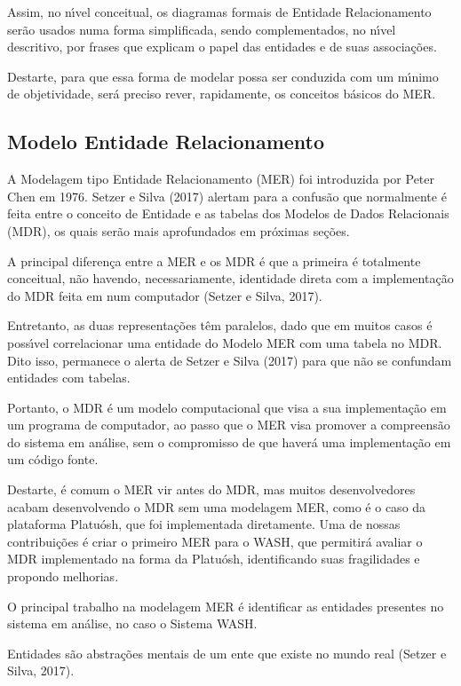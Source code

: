\documentclass[
12pt,		%
openright,	%
twoside,  %
a4paper,			%
chapter=TITLE,		%
english,			%
french,				%
spanish,			%
brazil				%
]{USPSC-classe/USPSC}
\begin{document}
Assim, no n\'{\i}vel conceitual, os diagramas formais de Entidade Relacionamento ser\~ao usados numa forma simplificada, sendo complementados, no n\'{\i}vel descritivo, por frases que explicam o papel das entidades e de suas associa\c{c}\~oes.


Destarte, para que essa forma de modelar possa ser conduzida com um m\'{\i}nimo de objetividade, ser\'a preciso rever, rapidamente, os conceitos b\'asicos do MER.


\subsection[Modelo Entidade Relacionamento]{Modelo Entidade Relacionamento}\label{Modelo Entidade Relacionamento}
A Modelagem tipo Entidade Relacionamento (MER) foi introduzida por Peter Chen em 1976. Setzer e Silva (2017) alertam para a confus\~ao que normalmente \'e feita entre o conceito de Entidade e as tabelas dos Modelos de Dados Relacionais (MDR), os quais ser\~ao mais aprofundados em pr\'oximas se\c{c}\~oes.


A principal diferen\c{c}a entre a MER e os MDR \'e que a primeira \'e totalmente conceitual, n\~ao havendo, necessariamente, identidade direta com a implementa\c{c}\~ao do MDR feita em num computador  (Setzer e Silva, 2017).


Entretanto, as duas representa\c{c}\~oes t\^em paralelos, dado que em muitos casos \'e poss\'{\i}vel correlacionar uma entidade do Modelo MER com uma tabela no MDR. Dito isso, permanece o alerta de  Setzer e Silva (2017) para que n\~ao se confundam entidades com tabelas.


Portanto, o MDR \'e um modelo computacional que visa a sua implementa\c{c}\~ao em um programa de computador, ao passo que o MER visa promover a compreens\~ao do sistema em an\'alise, sem o compromisso de que haver\'a uma implementa\c{c}\~ao em um c\'odigo fonte.


Destarte, \'e comum o MER vir antes do MDR, mas muitos desenvolvedores acabam desenvolvendo o MDR sem uma modelagem MER, como \'e o caso da plataforma Platu\'osh, que foi implementada diretamente. Uma de nossas contribui\c{c}\~oes \'e criar o primeiro MER para o WASH, que permitir\'a avaliar o MDR implementado na forma da Platu\'osh, identificando suas fragilidades e propondo melhorias.


O principal trabalho na modelagem MER \'e identificar as entidades presentes no sistema em an\'alise, no caso o Sistema WASH.


Entidades s\~ao abstra\c{c}\~oes mentais de um ente que existe no mundo real  (Setzer e Silva, 2017).
\end{document}
